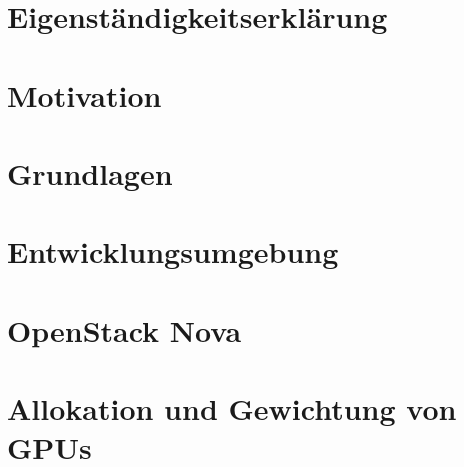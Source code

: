\documentclass[ngerman, a4paper, 12pt, oneside]{article}
\numberwithin{equation}{section} %
\def\biblio{\clearpage} %
\begin{document}
\def\biblio{} %


\restoregeometry %

\thispagestyle{plain} %
\clearpage\mbox{}\clearpage %

\newpage
\section*{Eigenständigkeitserklärung}
    

\newpage
{} %
\section*{Motivation}
    
    
\newpage
{ %
\tableofcontents
}

\newpage
{} %
\setcounter{page}{1} %

\section{Grundlagen} %
\clearpage %

\section{Entwicklungsumgebung}
	
\clearpage

\section{OpenStack Nova}
	
\clearpage

\section{Allokation und Gewichtung von GPUs}
	
\clearpage
\end{document}
